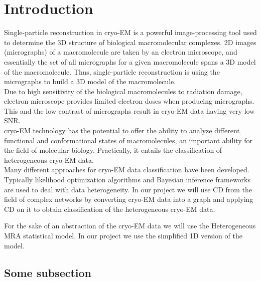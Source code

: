 \center

\section{Introduction}

\raggedright

Single-particle reconstruction in \acrshort{cryo-EM} is a powerful image-processing tool used to determine the 3D structure of biological macromolecular complexes.
2D images (micrographs) of a macromolecule are taken by an electron microscope, and essentially the set of all micrographs for a given macromolecule spans a 3D model of the macromolecule. Thus, single-particle reconstruction is using the micrographs to build a 3D model of the macromolecule.\\

Due to high sensitivity of the biological macromolecules to radiation damage, electron microscope provides limited electron doses when producing micrographs. This and the low contrast of micrographs result in \acrshort{cryo-EM} data having very low \acrfull{SNR}\cite{9016106}.\\

\acrshort{cryo-EM} technology has the potential to offer the ability to analyze different functional and conformational states of macromolecules, an important ability for the field of molecular biology. Practically, it entails the classification of heterogeneous \acrshort{cryo-EM} data.\\

Many different approaches for \acrshort{cryo-EM} data classification have been developed. Typically likelihood optimization algorithms and Bayesian inference frameworks are used to deal with data heterogeneity\cite{sigworth1998maximum,scheres2005fast,scheres2014beam,song2013flexibility,chowdhury2015structural}. In our project we will use \acrfull{CD} from the field of complex networks by converting \acrshort{cryo-EM} data into a graph and applying \acrshort{CD} on it to obtain classification of the heterogeneous \acrshort{cryo-EM} data.



For the sake of an abstraction of the \acrshort{cryo-EM} data we will use the Heterogeneous \acrfull{MRA} statistical model. In our project we use the simplified  1D version of the model.


\subsection{Some subsection}
\lipsum
